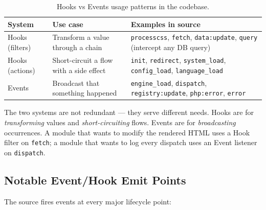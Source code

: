 \documentclass[11pt,a4paper]{article}
\begin{document}
\begin{table}[htbp]
\centering
\caption{Hooks vs Events usage patterns in the codebase.}\label{tab:hooks-vs-events}
\small
\begin{tabularx}{\columnwidth}{llX}
\toprule
\textbf{System} & \textbf{Use case} & \textbf{Examples in source} \\
\midrule
Hooks (filters) & Transform a value through a chain & \texttt{processcss}, \texttt{fetch}, \texttt{data:update}, \texttt{query} (intercept any DB query) \\
Hooks (actions) & Short-circuit a flow with a side effect & \texttt{init}, \texttt{redirect}, \texttt{system\_load}, \texttt{config\_load}, \texttt{language\_load} \\
Events & Broadcast that something happened & \texttt{engine\_load}, \texttt{dispatch}, \texttt{registry:update}, \texttt{php:error}, \texttt{error} \\
\bottomrule
\end{tabularx}
\end{table}

The two systems are not redundant --- they serve different needs.
Hooks are for \emph{transforming} values and \emph{short-circuiting}
flows. Events are for \emph{broadcasting} occurrences. A module that
wants to modify the rendered HTML uses a Hook filter on
\texttt{fetch}; a module that wants to log every dispatch uses an
Event listener on \texttt{dispatch}.

\subsection{Notable Event/Hook Emit Points}

The source fires events at every major lifecycle point:
\end{document}
